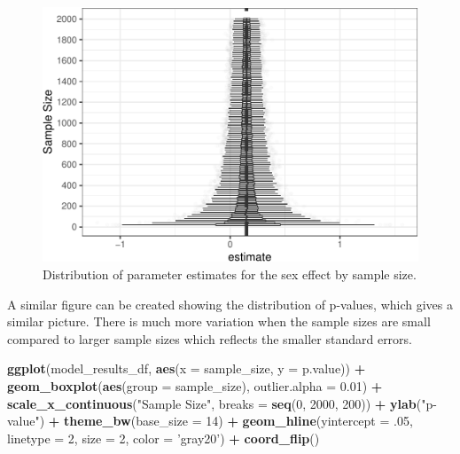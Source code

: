\documentclass[man,mask,floatsintext]{apa6}
\newenvironment{Shaded}{\begin{snugshade}}{\end{snugshade}}
\newcommand{\DataTypeTok}[1]{\textcolor[rgb]{0.13,0.29,0.53}{#1}}
\newcommand{\DecValTok}[1]{\textcolor[rgb]{0.00,0.00,0.81}{#1}}
\newcommand{\FloatTok}[1]{\textcolor[rgb]{0.00,0.00,0.81}{#1}}
\newcommand{\KeywordTok}[1]{\textcolor[rgb]{0.13,0.29,0.53}{\textbf{#1}}}
\newcommand{\NormalTok}[1]{#1}
\newcommand{\OperatorTok}[1]{\textcolor[rgb]{0.81,0.36,0.00}{\textbf{#1}}}
\newcommand{\StringTok}[1]{\textcolor[rgb]{0.31,0.60,0.02}{#1}}
\begin{document}
\begin{figure}
\centering
\includegraphics{power_simulation_files/figure-latex/estimate-figure-1.pdf}
\caption{\label{fig:estimate-figure}Distribution of parameter estimates for the sex effect by sample size.}
\end{figure}

A similar figure can be created showing the distribution of p-values, which gives a similar picture. There is much more variation when the sample sizes are small compared to larger sample sizes which reflects the smaller standard errors.

\begin{Shaded}
\begin{Highlighting}[]
\KeywordTok{ggplot}\NormalTok{(model_results_df, }\KeywordTok{aes}\NormalTok{(}\DataTypeTok{x =}\NormalTok{ sample_size, }\DataTypeTok{y =}\NormalTok{ p.value)) }\OperatorTok{+}\StringTok{ }
\StringTok{  }\KeywordTok{geom_boxplot}\NormalTok{(}\KeywordTok{aes}\NormalTok{(}\DataTypeTok{group =}\NormalTok{ sample_size), }\DataTypeTok{outlier.alpha =} \FloatTok{0.01}\NormalTok{) }\OperatorTok{+}
\StringTok{  }\KeywordTok{scale_x_continuous}\NormalTok{(}\StringTok{"Sample Size"}\NormalTok{, }\DataTypeTok{breaks =} \KeywordTok{seq}\NormalTok{(}\DecValTok{0}\NormalTok{, }\DecValTok{2000}\NormalTok{, }\DecValTok{200}\NormalTok{)) }\OperatorTok{+}
\StringTok{  }\KeywordTok{ylab}\NormalTok{(}\StringTok{"p-value"}\NormalTok{) }\OperatorTok{+}
\StringTok{  }\KeywordTok{theme_bw}\NormalTok{(}\DataTypeTok{base_size =} \DecValTok{14}\NormalTok{) }\OperatorTok{+}
\StringTok{  }\KeywordTok{geom_hline}\NormalTok{(}\DataTypeTok{yintercept =} \FloatTok{.05}\NormalTok{, }\DataTypeTok{linetype =} \DecValTok{2}\NormalTok{, }\DataTypeTok{size =} \DecValTok{2}\NormalTok{, }\DataTypeTok{color =} \StringTok{'gray20'}\NormalTok{) }\OperatorTok{+}
\StringTok{  }\KeywordTok{coord_flip}\NormalTok{()}
\end{Highlighting}
\end{Shaded}
\end{document}
